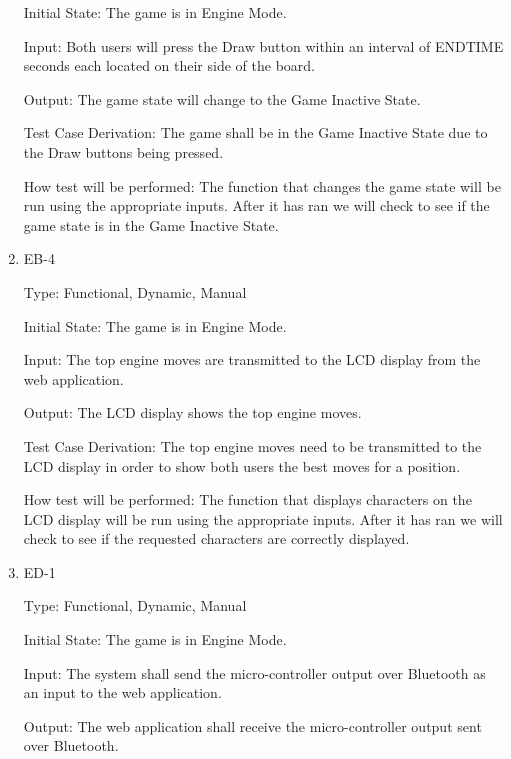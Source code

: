 \documentclass[12pt, titlepage]{article}
\begin{document}
\begin{enumerate}
      Initial State: The game is in Engine Mode.
                          
      Input: Both users will press the Draw button within an interval of ENDTIME seconds each located on their side of the board.
                          
      Output: The game state will change to the Game Inactive State.
                          
      Test Case Derivation: The game shall be in the Game Inactive State due to the Draw buttons being pressed.
      
      How test will be performed: The function that changes the game state will be run using the appropriate inputs.
      After it has ran we will check to see if the game state is in the Game Inactive State.
  
      \item{EB-4\\}
  
      Type: Functional, Dynamic, Manual
                        
      Initial State: The game is in Engine Mode.
                          
      Input: The top engine moves are transmitted to the LCD display from the web application.
                          
      Output: The LCD display shows the top engine moves.
                          
      Test Case Derivation: The top engine moves need to be transmitted
      to the LCD display in order to show both users the best moves for a position.
      
      How test will be performed: The function that displays characters on the LCD display will be run using the appropriate inputs.
      After it has ran we will check to see if the requested characters are correctly displayed.
  
      \item{ED-1\\}
  
      Type: Functional, Dynamic, Manual
                        
      Initial State: The game is in Engine Mode.
                          
      Input: The system shall send the micro-controller output over Bluetooth as an input to the web application.
                          
      Output: The web application shall receive the micro-controller output sent over Bluetooth.
                          

\end{enumerate}
\end{document}
